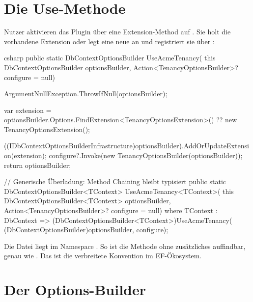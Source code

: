 \section{Die Use-Methode}

Nutzer aktivieren das Plugin über eine Extension-Method auf
. Sie holt die
vorhandene Extension oder legt eine neue an und registriert sie über
:

\begin{sourcecode}{csharp}
public static DbContextOptionsBuilder UseAcmeTenancy(
    this DbContextOptionsBuilder optionsBuilder,
    Action<TenancyOptionsBuilder>? configure = null)
{
    ArgumentNullException.ThrowIfNull(optionsBuilder);

    var extension = optionsBuilder.Options.FindExtension<TenancyOptionsExtension>()
                    ?? new TenancyOptionsExtension();

    ((IDbContextOptionsBuilderInfrastructure)optionsBuilder).AddOrUpdateExtension(extension);
    configure?.Invoke(new TenancyOptionsBuilder(optionsBuilder));
    return optionsBuilder;
}

// Generische Überladung: Method Chaining bleibt typisiert
public static DbContextOptionsBuilder<TContext> UseAcmeTenancy<TContext>(
    this DbContextOptionsBuilder<TContext> optionsBuilder,
    Action<TenancyOptionsBuilder>? configure = null) where TContext : DbContext
    => (DbContextOptionsBuilder<TContext>)UseAcmeTenancy(
        (DbContextOptionsBuilder)optionsBuilder, configure);
\end{sourcecode}

Die Datei liegt im Namespace
. So ist die
Methode ohne zusätzliches  auffindbar, genau wie .
Das ist die verbreitete Konvention im EF-Ökosystem.

\section{Der Options-Builder}

